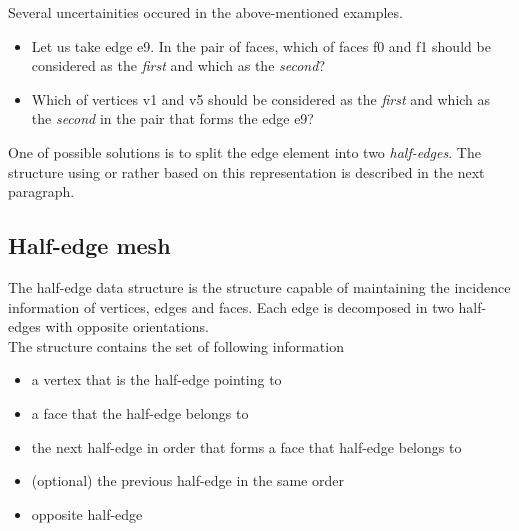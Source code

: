 Several uncertainities occured in the above-mentioned examples.

\begin{itemize}
\item Let us take edge \textsf{e9}. In the pair of faces, which of faces \textsf{f0} and 
\textsf{f1} should be considered as the \emph{first} and which as the \emph{second}?

\item Which of vertices \textsf{v1} and \textsf{v5} should be considered as 
the \emph{first} and which as the \emph{second} in the pair that forms the edge \textsf{e9}?
\end{itemize}

One of possible solutions is to split the edge element into two \emph{half-edges}.
The structure using or rather based on this representation is described in the next
paragraph.

\subsection{Half-edge mesh}

The half-edge data structure is the structure capable of maintaining the incidence
information of vertices, edges and faces\cite{Botsch2006}. Each edge is decomposed in two half-edges
with opposite orientations.
\\

The structure contains the set of following information
\begin{itemize}
\item a vertex that is the half-edge pointing to
\item a face that the half-edge belongs to
\item the next half-edge in order that forms a face that half-edge belongs to
\item (optional) the previous half-edge in the same order
\item opposite half-edge
\end{itemize}

